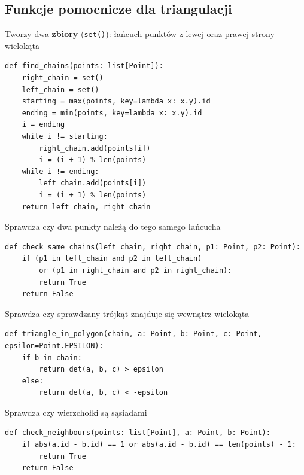 \documentclass[12pt]{article}
\begin{document}
\newpage

\subsection*{Funkcje pomocnicze dla triangulacji}
\mbox{}
\par Tworzy dwa \textbf{zbiory} (\verb|set()|): łańcuch punktów z lewej oraz prawej strony wielokąta
\begin{Verbatim}
def find_chains(points: list[Point]):
	right_chain = set()
	left_chain = set()
	starting = max(points, key=lambda x: x.y).id
	ending = min(points, key=lambda x: x.y).id
	i = ending
	while i != starting:
		right_chain.add(points[i])
		i = (i + 1) % len(points)
	while i != ending:
		left_chain.add(points[i])
		i = (i + 1) % len(points)
	return left_chain, right_chain
\end{Verbatim}

\mbox{}
\par Sprawdza czy dwa punkty należą do tego samego łańcucha
\begin{Verbatim}
def check_same_chains(left_chain, right_chain, p1: Point, p2: Point):
	if (p1 in left_chain and p2 in left_chain) 
		or (p1 in right_chain and p2 in right_chain):
		return True
	return False
\end{Verbatim}

\mbox{}
\par Sprawdza czy sprawdzany trójkąt znajduje się wewnątrz wielokąta
\begin{Verbatim}
def triangle_in_polygon(chain, a: Point, b: Point, c: Point, epsilon=Point.EPSILON):
	if b in chain:
		return det(a, b, c) > epsilon
	else:
		return det(a, b, c) < -epsilon
\end{Verbatim}

\mbox{}
\par Sprawdza czy wierzchołki są sąsiadami
\begin{Verbatim}
def check_neighbours(points: list[Point], a: Point, b: Point):
	if abs(a.id - b.id) == 1 or abs(a.id - b.id) == len(points) - 1:
		return True
	return False
\end{Verbatim}

\newpage
\end{document}
